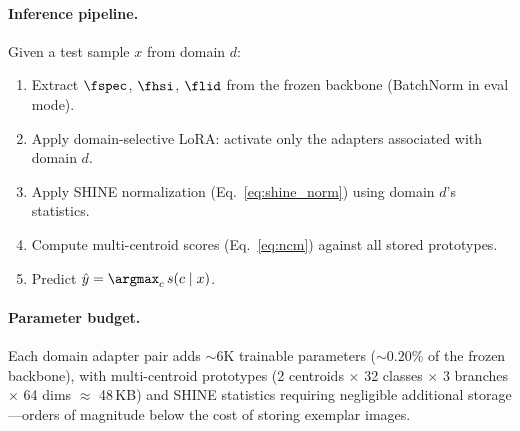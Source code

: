 \paragraph{Inference pipeline.}
Given a test sample $x$ from domain $d$:
\begin{enumerate}
    \item Extract $\fspec$, $\fhsi$, $\flid$ from the frozen backbone (BatchNorm in eval mode).
    \item Apply domain-selective LoRA: activate only the adapters associated with domain $d$.
    \item Apply SHINE normalization (Eq.~\ref{eq:shine_norm}) using domain $d$'s statistics.
    \item Compute multi-centroid scores (Eq.~\ref{eq:ncm}) against all stored prototypes.
    \item Predict $\hat{y} = \argmax_c\, s(c \mid x)$.
\end{enumerate}

\paragraph{Parameter budget.}
Each domain adapter pair adds ${\sim}6$K trainable parameters (${\sim}0.20\%$ of the frozen \backbonename{} backbone), with multi-centroid prototypes (2 centroids $\times$ 32 classes $\times$ 3 branches $\times$ 64 dims $\approx$ 48\,KB) and SHINE statistics requiring negligible additional storage---orders of magnitude below the cost of storing exemplar images.
